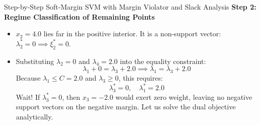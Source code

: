 \begin{examplebox}[breakable]{Step-by-Step Soft-Margin SVM with Margin Violator and Slack Analysis}
\textbf{Step 2: Regime Classification of Remaining Points}
\begin{itemize}
    \item $x_2 = 4.0$ lies far in the positive interior. It is a non-support vector: $\lambda_2^* = 0 \implies \xi_2^* = 0$.
    \item Substituting $\lambda_2 = 0$ and $\lambda_4 = 2.0$ into the equality constraint:
    \begin{equation}
    \lambda_1 + 0 = \lambda_3 + 2.0 \implies \lambda_1 = \lambda_3 + 2.0
    \end{equation}
    Because $\lambda_1 \le C = 2.0$ and $\lambda_3 \ge 0$, this requires:
    \begin{equation}
    \lambda_3^* = 0, \quad \lambda_1^* = 2.0
    \end{equation}
    Wait! If $\lambda_3^* = 0$, then $x_3 = -2.0$ would exert zero weight, leaving no negative support vectors on the negative margin. Let us solve the dual objective analytically.
\end{itemize}


\end{examplebox}
